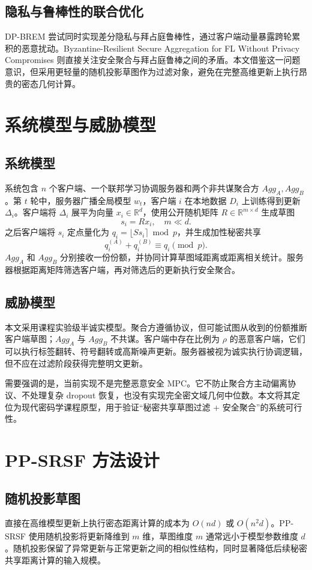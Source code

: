 \documentclass[UTF8,a4paper,zihao=-4]{ctexart}
\begin{document}
\subsection{隐私与鲁棒性的联合优化}
DP-BREM 尝试同时实现差分隐私与拜占庭鲁棒性，通过客户端动量暴露跨轮累积的恶意扰动\cite{gu2025dpbrem}。Byzantine-Resilient Secure Aggregation for FL Without Privacy Compromises 则直接关注安全聚合与拜占庭鲁棒之间的矛盾\cite{xia2024secureagg}。本文借鉴这一问题意识，但采用更轻量的随机投影草图作为过滤对象，避免在完整高维更新上执行昂贵的密态几何计算。

\section{系统模型与威胁模型}
\subsection{系统模型}
系统包含 $n$ 个客户端、一个联邦学习协调服务器和两个非共谋聚合方 $Agg_A,Agg_B$。第 $t$ 轮中，服务器广播全局模型 $w_t$，客户端 $i$ 在本地数据 $D_i$ 上训练得到更新 $\Delta_i$。客户端将 $\Delta_i$ 展平为向量 $x_i\in\mathbb{R}^{d}$，使用公开随机矩阵 $R\in\mathbb{R}^{m\times d}$ 生成草图
\[
s_i = R x_i,\quad m \ll d.
\]
之后客户端将 $s_i$ 定点量化为 $q_i=\lfloor S s_i\rceil\bmod p$，并生成加性秘密共享
\[
q_i^{(A)} + q_i^{(B)} \equiv q_i \pmod p.
\]
$Agg_A$ 和 $Agg_B$ 分别接收一份份额，并协同计算草图域距离或距离相关统计。服务器根据距离矩阵筛选客户端，再对筛选后的更新执行安全聚合。

\subsection{威胁模型}
本文采用课程实验级半诚实模型。聚合方遵循协议，但可能试图从收到的份额推断客户端草图；$Agg_A$ 与 $Agg_B$ 不共谋。客户端中存在比例为 $\rho$ 的恶意客户端，它们可以执行标签翻转、符号翻转或高斯噪声更新。服务器被视为诚实执行协调逻辑，但不应在过滤阶段获得完整明文更新。

需要强调的是，当前实现不是完整恶意安全 MPC。它不防止聚合方主动偏离协议、不处理复杂 dropout 恢复，也没有实现完全密文域几何中位数。本文将其定位为现代密码学课程原型，用于验证“秘密共享草图过滤 + 安全聚合”的系统可行性。

\section{PP-SRSF 方法设计}
\subsection{随机投影草图}
直接在高维模型更新上执行密态距离计算的成本为 $O(nd)$ 或 $O(n^2d)$。PP-SRSF 使用随机投影将更新降维到 $m$ 维，草图维度 $m$ 通常远小于模型参数维度 $d$。随机投影保留了异常更新与正常更新之间的相似性结构，同时显著降低后续秘密共享距离计算的输入规模。
\end{document}
